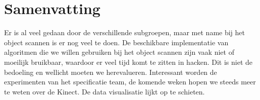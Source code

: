 \documentclass[10pt,a4paper]{article}
\begin{document}
\section{Samenvatting}
Er is al veel gedaan door de verschillende subgroepen, maar met name bij het object scannen is er nog veel te doen. De beschikbare implementatie van algoritmen die we willen gebruiken bij het object scannen zijn vaak niet of moeilijk bruikbaar, waardoor er veel tijd komt te zitten in hacken. Dit is niet de bedoeling en wellicht moeten we herevalueren. Interessant worden de experimenten van het specificatie team, de komende weken hopen we steeds meer te weten over de Kinect. De data visualisatie lijkt op te schieten.
\end{document}

